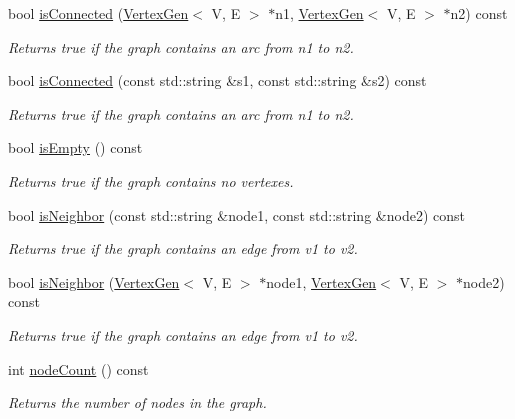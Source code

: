\begin{DoxyCompactItemize}
bool \mbox{\hyperlink{classGraph_a54164ab847f3a5c7fe15d15ac95af443}{is\+Connected}} (\mbox{\hyperlink{classVertexGen}{Vertex\+Gen}}$<$ V, E $>$ $\ast$n1, \mbox{\hyperlink{classVertexGen}{Vertex\+Gen}}$<$ V, E $>$ $\ast$n2) const
\begin{DoxyCompactList}\small\item\em Returns {\ttfamily true} if the graph contains an arc from {\ttfamily n1} to {\ttfamily n2}. \end{DoxyCompactList}\item 
bool \mbox{\hyperlink{classGraph_a3623b7decbedc522041c2c39d3b14421}{is\+Connected}} (const std\+::string \&s1, const std\+::string \&s2) const
\begin{DoxyCompactList}\small\item\em Returns {\ttfamily true} if the graph contains an arc from {\ttfamily n1} to {\ttfamily n2}. \end{DoxyCompactList}\item 
bool \mbox{\hyperlink{classGraph_acf82f9b2937375c7b1cf3dccb3df3312}{is\+Empty}} () const
\begin{DoxyCompactList}\small\item\em Returns {\ttfamily true} if the graph contains no vertexes. \end{DoxyCompactList}\item 
bool \mbox{\hyperlink{classGraph_ab160bb64995133f6feb351cb23b031fb}{is\+Neighbor}} (const std\+::string \&node1, const std\+::string \&node2) const
\begin{DoxyCompactList}\small\item\em Returns true if the graph contains an edge from v1 to v2. \end{DoxyCompactList}\item 
bool \mbox{\hyperlink{classGraph_a9e752628a118c4a06a538067c95bbb28}{is\+Neighbor}} (\mbox{\hyperlink{classVertexGen}{Vertex\+Gen}}$<$ V, E $>$ $\ast$node1, \mbox{\hyperlink{classVertexGen}{Vertex\+Gen}}$<$ V, E $>$ $\ast$node2) const
\begin{DoxyCompactList}\small\item\em Returns true if the graph contains an edge from v1 to v2. \end{DoxyCompactList}\item 
int \mbox{\hyperlink{classGraph_a5dd1afdb4e1c75fbe51976bf6f70c922}{node\+Count}} () const
\begin{DoxyCompactList}\small\item\em Returns the number of nodes in the graph. \end{DoxyCompactList}\item 

\end{DoxyCompactItemize}
